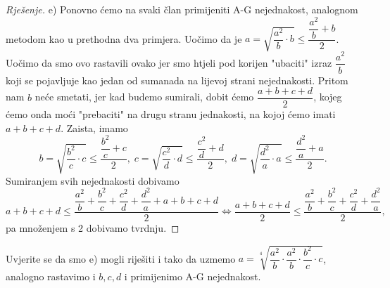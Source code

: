 \begin{proof}[Rješenje]
e) Ponovno ćemo na svaki član primijeniti A-G nejednakost, analognom metodom kao u prethodna dva primjera. Uočimo da je
$a=\sqrt{\dfrac{a^2}{b}\cdot b}\leq \dfrac{\dfrac{a^2}{b}+b}{2}$. Uočimo da smo ovo rastavili ovako jer smo htjeli pod korijen "ubaciti" izraz $\dfrac{a^2}{b}$ koji se pojavljuje kao jedan od sumanada na lijevoj strani nejednakosti. Pritom nam $b$ neće smetati, jer kad budemo sumirali, dobit ćemo $\dfrac{a+b+c+d}{2}$, kojeg ćemo onda moći "prebaciti" na drugu stranu jednakosti, na kojoj ćemo imati $a+b+c+d$. Zaista, imamo $$b=\sqrt{\dfrac{b^2}{c}\cdot c}\leq \dfrac{\dfrac{b^2}{c}+c}{2},\;c=\sqrt{\dfrac{c^2}{d}\cdot d}\leq \dfrac{\dfrac{c^2}{d}+d}{2},\;d=\sqrt{\dfrac{d^2}{a}\cdot a}\leq \dfrac{\dfrac{d^2}{a}+a}{2}. $$Sumiranjem svih nejednakosti dobivamo
$$a+b+c+d\leq\dfrac{\dfrac{a^2}{b}+\dfrac{b^2}{c}+\dfrac{c^2}{d}+\dfrac{d^2}{a}+a+b+c+d}{2}\Leftrightarrow \dfrac{a+b+c+d}{2}\leq \dfrac{\dfrac{a^2}{b}+\dfrac{b^2}{c}+\dfrac{c^2}{d}+\dfrac{d^2}{a}}{2},$$
pa množenjem s 2 dobivamo tvrdnju.
\end{proof}
\begin{remark}
Uvjerite se da smo e) mogli riješiti i tako da uzmemo $a=\sqrt[4]{\dfrac{a^2}{b}\cdot \dfrac{a^2}{b}\cdot \dfrac{b^2}{c}\cdot c}$, analogno rastavimo i $b, c, d$ i primijenimo A-G nejednakost.
\end{remark}

